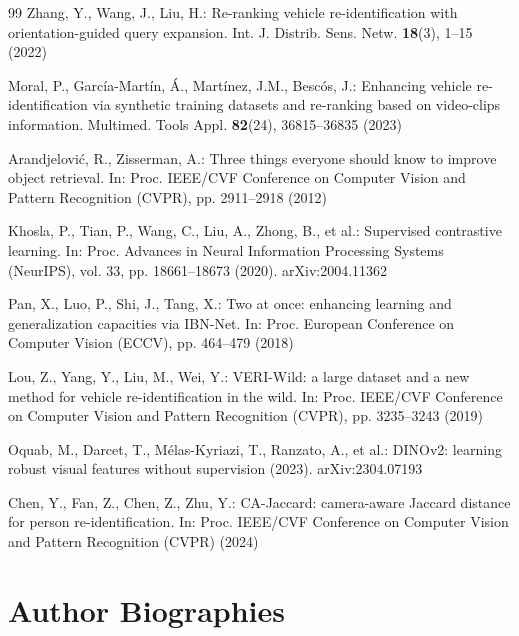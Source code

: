 \documentclass[10pt,a4paper]{article}
\begin{document}
\begin{thebibliography}{99}
Zhang, Y., Wang, J., Liu, H.: Re-ranking vehicle re-identification with
orientation-guided query expansion. Int. J. Distrib. Sens. Netw.
\textbf{18}(3), 1--15 (2022)

Moral, P., Garc\'{i}a-Mart\'{i}n, \'{A}., Mart\'{i}nez, J.M., Besc\'{o}s, J.:
Enhancing vehicle re-identification via synthetic training datasets and
re-ranking based on video-clips information. Multimed. Tools Appl.
\textbf{82}(24), 36815--36835 (2023)

Arandjelovi\'{c}, R., Zisserman, A.: Three things everyone should know to
improve object retrieval. In: Proc. IEEE/CVF Conference on Computer Vision and
Pattern Recognition (CVPR), pp. 2911--2918 (2012)

Khosla, P., Tian, P., Wang, C., Liu, A., Zhong, B., et al.: Supervised
contrastive learning. In: Proc. Advances in Neural Information Processing
Systems (NeurIPS), vol. 33, pp. 18661--18673 (2020). arXiv:2004.11362

Pan, X., Luo, P., Shi, J., Tang, X.: Two at once: enhancing learning and
generalization capacities via IBN-Net. In: Proc. European Conference on
Computer Vision (ECCV), pp. 464--479 (2018)

Lou, Z., Yang, Y., Liu, M., Wei, Y.: VERI-Wild: a large dataset and a new
method for vehicle re-identification in the wild. In: Proc. IEEE/CVF Conference
on Computer Vision and Pattern Recognition (CVPR), pp. 3235--3243 (2019)

Oquab, M., Darcet, T., M\'{e}las-Kyriazi, T., Ranzato, A., et al.: DINOv2:
learning robust visual features without supervision (2023). arXiv:2304.07193

Chen, Y., Fan, Z., Chen, Z., Zhu, Y.: CA-Jaccard: camera-aware Jaccard distance
for person re-identification. In: Proc. IEEE/CVF Conference on Computer Vision
and Pattern Recognition (CVPR) (2024)

\end{thebibliography}

\section*{Author Biographies}
\end{document}
